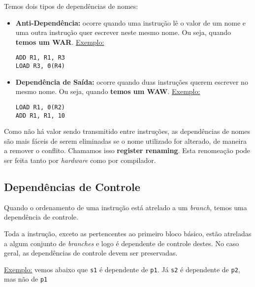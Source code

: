 Temos dois tipos de dependências de nomes:
\begin{itemize}
  \item \textbf{Anti-Dependência:} ocorre quando uma instrução lê o valor de um nome e uma outra instrução quer escrever neste mesmo nome. Ou seja, quando \textbf{temos um WAR}. \underline{Exemplo:}

  \begin{center}
    \texttt{ADD R1, R1, R3}\\
    \texttt{LOAD R3, 0(R4)}\\
  \end{center}

  \item \textbf{Dependência de Saída:} ocorre quando duas instruções querem escrever no mesmo nome. Ou seja, quando \textbf{temos um WAW}.
  \underline{Exemplo:}

  \begin{center}
    \texttt{LOAD R1, 0(R2)}\\
    \texttt{ADD R1, R1, 10}\\
  \end{center}
\end{itemize}

Como não há valor sendo transmitido entre instruções, as dependências de nomes são mais fáceis de serem eliminadas se o nome utilizado for alterado, de maneira a remover o conflito. Chamamos isso \textbf{register renaming}. Esta renomeação pode ser feita tanto por \textit{hardware} como por compilador.






\subsection{Dependências de Controle}
\begin{definicao}{}
  Quando o ordenamento de uma instrução está atrelado a um \textit{branch}, temos uma dependência de controle.
\end{definicao}

Toda a instrução, exceto as pertencentes ao primeiro bloco básico, estão atreladas a algum conjunto de \textit{branches} e logo é dependente de controle destes. No caso geral, as dependências de controle devem ser preservadas.

\underline{Exemplo:} vemos abaixo que \texttt{s1} é dependente de \texttt{p1}. Já \texttt{s2} é dependente de \texttt{p2}, mas não de \texttt{p1}\\

